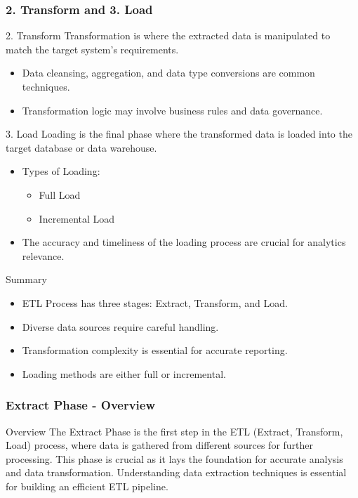 \documentclass[aspectratio=169]{beamer}
\begin{document}
\begin{frame}[fragile]
    \frametitle{2. Transform and 3. Load}
    \begin{block}{2. Transform}
        Transformation is where the extracted data is manipulated to match the target system's requirements.
        \begin{itemize}
            \item Data cleansing, aggregation, and data type conversions are common techniques.
            \item Transformation logic may involve business rules and data governance.
        \end{itemize}
    \end{block}
    
    \begin{block}{3. Load}
        Loading is the final phase where the transformed data is loaded into the target database or data warehouse.
        \begin{itemize}
            \item Types of Loading:
                \begin{itemize}
                    \item Full Load
                    \item Incremental Load
                \end{itemize}
            \item The accuracy and timeliness of the loading process are crucial for analytics relevance.
        \end{itemize}
    \end{block}
    
    \begin{block}{Summary}
        \begin{itemize}
            \item ETL Process has three stages: Extract, Transform, and Load.
            \item Diverse data sources require careful handling.
            \item Transformation complexity is essential for accurate reporting.
            \item Loading methods are either full or incremental.
        \end{itemize}
    \end{block}
\end{frame}

\begin{frame}[fragile]
    \frametitle{Extract Phase - Overview}
    \begin{block}{Overview}
        The Extract Phase is the first step in the ETL (Extract, Transform, Load) process, where data is gathered from different sources for further processing. 
        This phase is crucial as it lays the foundation for accurate analysis and data transformation.
        Understanding data extraction techniques is essential for building an efficient ETL pipeline.
    \end{block}
\end{frame}
\end{document}
